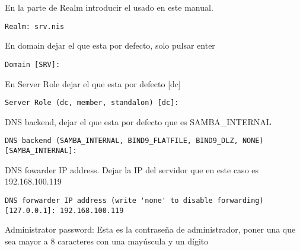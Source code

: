 \documentclass[../main.tex]{subfiles}
\begin{document}
\begin{enumerate}
    En la parte de Realm introducir el usado en este manual.

    \begin{listing}[H]
  \begin{verbatim}
Realm: srv.nis
\end{verbatim}
\end{listing}

    En domain dejar el que esta por defecto, solo pulsar enter

    \begin{listing}[H]
  \begin{verbatim}
Domain [SRV]:
\end{verbatim}
\end{listing}

    En Server Role dejar el que esta por defecto [dc]

    \begin{listing}[H]
  \begin{verbatim}
Server Role (dc, member, standalon) [dc]:
    \end{verbatim}
\end{listing}

    DNS backend, dejar el que esta por defecto que es SAMBA\_INTERNAL

    \begin{listing}[H]
  \begin{verbatim}
DNS backend (SAMBA_INTERNAL, BIND9_FLATFILE, BIND9_DLZ, NONE) [SAMBA_INTERNAL]:
\end{verbatim}
\end{listing}

    DNS fowarder IP address. Dejar la IP del servidor que en este caso es 192.168.100.119

    \begin{listing}[H]
  \begin{verbatim}
DNS forwarder IP address (write 'none' to disable forwarding) [127.0.0.1]: 192.168.100.119
\end{verbatim}
\end{listing}

    Administrator password: Esta es la contraseña de administrador, poner una que sea mayor a 8 caracteres con una mayúscula y un dígito


\end{enumerate}
\end{document}

